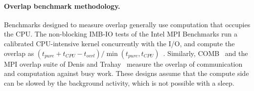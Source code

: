 \paragraph{Overlap benchmark methodology.} Benchmarks designed to measure
overlap generally use computation that occupies the CPU. The non-blocking
IMB-IO tests of the Intel MPI Benchmarks run a calibrated CPU-intensive
kernel concurrently with the I/O, and compute the overlap as
$(t_{pure} + t_{CPU} - t_{ovrl}) / \min(t_{pure}, t_{CPU})$~\cite{intel_imb_io}.
Similarly, COMB~\cite{lawry2002comb} and the MPI overlap suite of Denis and
Trahay~\cite{denis2016overlap} measure the overlap of communication and
computation against busy work. These designs assume that the compute side
can be slowed by the background activity, which is not possible with a
sleep.
